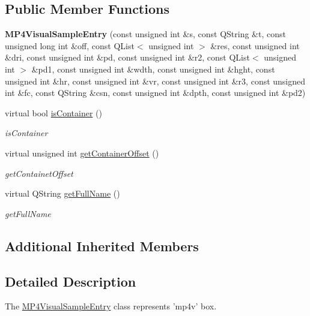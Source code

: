 \subsection*{Public Member Functions}
\begin{DoxyCompactItemize}
\item 
\hypertarget{class_m_p4_visual_sample_entry_aeb56db7a4cb1bdf4721f98ce0ce65360}{{\bfseries M\-P4\-Visual\-Sample\-Entry} (const unsigned int \&s, const Q\-String \&t, const unsigned long int \&off, const Q\-List$<$ unsigned int $>$ \&res, const unsigned int \&dri, const unsigned int \&pd, const unsigned int \&r2, const Q\-List$<$ unsigned int $>$ \&pd1, const unsigned int \&wdth, const unsigned int \&hght, const unsigned int \&hr, const unsigned int \&vr, const unsigned int \&r3, const unsigned int \&fc, const Q\-String \&csn, const unsigned int \&dpth, const unsigned int \&pd2)}\label{class_m_p4_visual_sample_entry_aeb56db7a4cb1bdf4721f98ce0ce65360}

\item 
virtual bool \hyperlink{class_m_p4_visual_sample_entry_aa683a32a4491a554bfc03b0fe1197bfc}{is\-Container} ()
\begin{DoxyCompactList}\small\item\em is\-Container \end{DoxyCompactList}\item 
virtual unsigned int \hyperlink{class_m_p4_visual_sample_entry_a5ef15604b8bd6d3626dcbef1698346a9}{get\-Container\-Offset} ()
\begin{DoxyCompactList}\small\item\em get\-Containet\-Offset \end{DoxyCompactList}\item 
virtual Q\-String \hyperlink{class_m_p4_visual_sample_entry_a82117470bd8bbda71839fff2b9a069c6}{get\-Full\-Name} ()
\begin{DoxyCompactList}\small\item\em get\-Full\-Name \end{DoxyCompactList}\end{DoxyCompactItemize}
\subsection*{Additional Inherited Members}


\subsection{Detailed Description}
The \hyperlink{class_m_p4_visual_sample_entry}{M\-P4\-Visual\-Sample\-Entry} class represents 'mp4v' box. 

